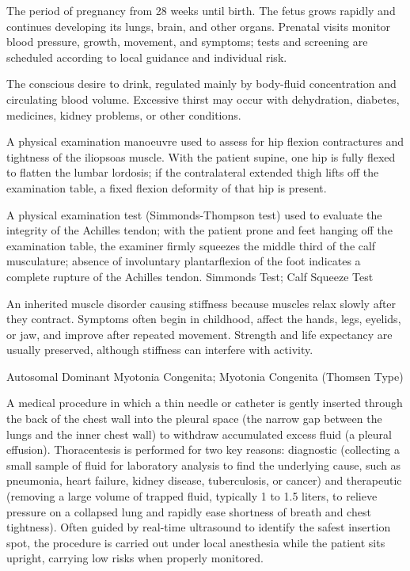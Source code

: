  The period of pregnancy from 28 weeks until birth. The fetus grows rapidly and continues developing its lungs, brain, and other organs. Prenatal visits monitor blood pressure, growth, movement, and symptoms; tests and screening are scheduled according to local guidance and individual risk.

 The conscious desire to drink, regulated mainly by body-fluid concentration and circulating blood volume. Excessive thirst may occur with dehydration, diabetes, medicines, kidney problems, or other conditions.

 A physical examination manoeuvre used to assess for hip flexion contractures and tightness of the iliopsoas muscle. With the patient supine, one hip is fully flexed to flatten the lumbar lordosis; if the contralateral extended thigh lifts off the examination table, a fixed flexion deformity of that hip is present.

 A physical examination test (Simmonds-Thompson test) used to evaluate the integrity of the Achilles tendon; with the patient prone and feet hanging off the examination table, the examiner firmly squeezes the middle third of the calf musculature; absence of involuntary plantarflexion of the foot indicates a complete rupture of the Achilles tendon.
\synonyms
Simmonds Test; Calf Squeeze Test

 An inherited muscle disorder causing stiffness because muscles relax slowly after they contract. Symptoms often begin in childhood, affect the hands, legs, eyelids, or jaw, and improve after repeated movement. Strength and life expectancy are usually preserved, although stiffness can interfere with activity.

\synonyms
Autosomal Dominant Myotonia Congenita; Myotonia Congenita (Thomsen Type)

 A medical procedure in which a thin needle or catheter is gently inserted through the back of the chest wall into the pleural space (the narrow gap between the lungs and the inner chest wall) to withdraw accumulated excess fluid (a pleural effusion). Thoracentesis is performed for two key reasons: diagnostic (collecting a small sample of fluid for laboratory analysis to find the underlying cause, such as pneumonia, heart failure, kidney disease, tuberculosis, or cancer) and therapeutic (removing a large volume of trapped fluid, typically 1 to 1.5 liters, to relieve pressure on a collapsed lung and rapidly ease shortness of breath and chest tightness). Often guided by real-time ultrasound to identify the safest insertion spot, the procedure is carried out under local anesthesia while the patient sits upright, carrying low risks when properly monitored.

